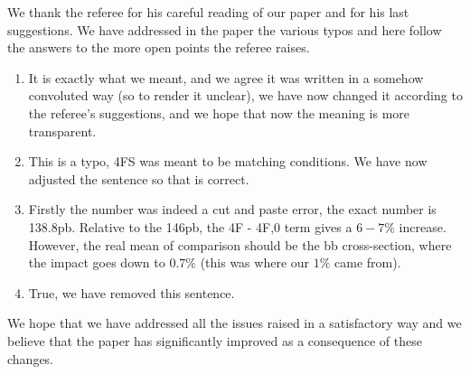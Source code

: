 \documentclass[12pt]{article}
\begin{document}
We thank the referee for his careful reading of our paper and for his
last suggestions. We have addressed in the paper the various typos
and here follow the answers to the more open points the referee raises.
\begin{enumerate}
\item{It is exactly what we meant, and we agree it was written in a
  somehow convoluted way (so to render it unclear), we have now changed it
  according to the referee's suggestions, and we hope that now the
  meaning is more transparent.}
\item{This is a typo, 4FS was meant to be matching conditions. We
  have now adjusted the sentence so that is correct.}
\item{Firstly the number was indeed a cut and paste error, the exact
  number is 138.8pb. Relative to the 146pb, the 4F - 4F,0 term
  gives a $6-7\%$ increase. However, the real mean of comparison should
  be the bb cross-section, where the impact goes down to $0.7\%$ (this was
  where our $1\%$ came from).}
\item{True, we have removed this sentence.}
\end{enumerate}
We hope that we have addressed all the issues raised in a satisfactory
way and we believe that the paper has significantly improved as a
consequence of these changes.
\end{document}
